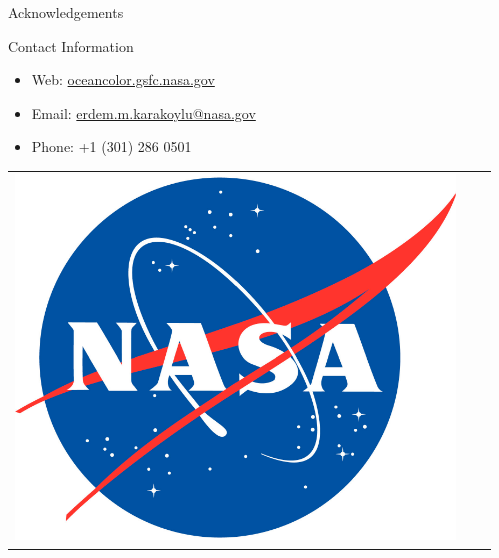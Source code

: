 \documentclass[final]{beamer}
\newlength{\sepwid}
\newlength{\onecolwid}
\begin{document}
\begin{frame}[t]
\begin{columns}[t]
\begin{column}{\onecolwid}
\begin{block}{Acknowledgements}
\end{block}


\vspace{2ex}
\begin{alertblock}{Contact Information}

\begin{itemize}
\item Web: \href{oceancolor.gsfc.nasa.gov}{oceancolor.gsfc.nasa.gov}
\item Email: \href{mailto:erdem.m.karakoylu@nasa.gov}{erdem.m.karakoylu@nasa.gov}
\item Phone: +1 (301) 286 0501
\end{itemize}

\end{alertblock}
\vspace{2ex}
\begin{center}
\begin{tabular}{ccc}
\includegraphics[width=0.5\linewidth]{meatball.pdf} & \hfill 
\end{tabular}
\end{center}


\end{column} %
\begin{column}{\sepwid}\end{column} %
\end{columns} %

\end{frame} %
\end{document}
